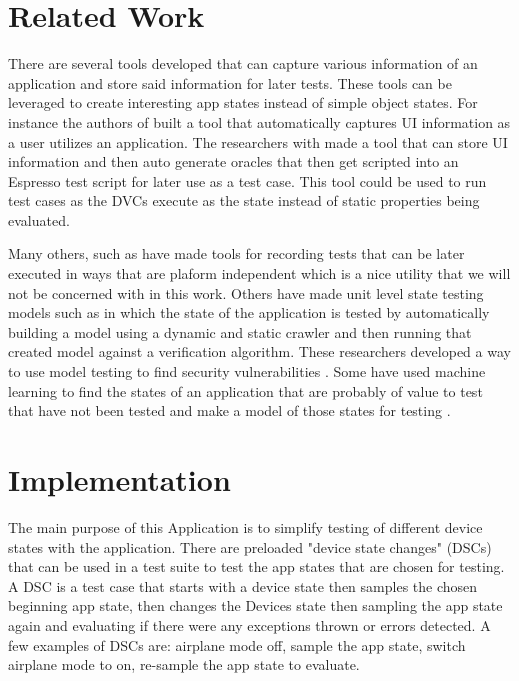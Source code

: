 \section{Related Work}
There are several tools developed that can capture various information of an application and store said information for later tests.  These tools can be leveraged to create interesting app states instead of simple object states.  For instance the authors of \cite{7962332} built a tool that automatically captures UI information as a user utilizes an application.  The researchers with\cite{7927971} made a tool that can store UI information and then auto generate oracles that then get scripted into an Espresso test script for later use as a test case.  This tool could be used to run test cases as the DVCs execute as the state instead of static properties being evaluated. 

Many others, such as \cite{7927971} have made tools for recording tests that can be later executed in ways that are plaform independent which is a nice utility that we will not be concerned with in this work.  Others have made unit level state testing models such as \cite{MilaniFard:2014:LET:2642937.2642991} in which the state of the application is tested by automatically building a model using a dynamic and static crawler and then running that created model against a verification algorithm.  These researchers developed a way to use model testing to find security vulnerabilities \cite{7911333}.  Some have used machine learning to find the states of an application that are probably of value to test that have not been tested and make a model of those states for testing \cite{Choi:2013:GGT:2544173.2509552}.


\section{Implementation}
The main purpose of this Application is to simplify testing of different device states with the application.  There are preloaded "device state changes" (DSCs) that can be used in a test suite to test the app states that are chosen for testing.  A DSC is a test case that starts with a device state then samples the chosen beginning app state, then changes the Devices state then sampling the app state again and evaluating if there were any exceptions thrown or errors detected.  A few examples of DSCs are: airplane mode off, sample the app state, switch airplane mode to on, re-sample the app state to evaluate.
